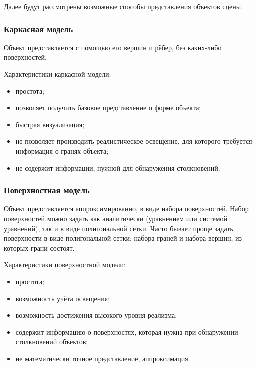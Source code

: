 Далее будут рассмотрены возможные способы представления объектов сцены.

\subsubsection{Каркасная модель}

Объект представляется с помощью его вершин и рёбер, без каких-либо поверхностей.

Характеристики каркасной модели:
\begin{itemize}
    \item простота;
    \item позволяет получить базовое представление о форме объекта;
    \item быстрая визуализация;
    \item не позволяет производить реалистическое освещение, для которого требуется информация о гранях объекта;
    \item не содержит информации, нужной для обнаружения столкновений.
\end{itemize}


\subsubsection{Поверхностная модель}

Объект представляется аппроксимированно, в виде набора поверхностей.
Набор поверхностей можно задать как аналитически (уравнением или системой уравнений), так и в виде полигональной сетки.
Часто бывает проще задать поверхности в виде полигональной сетки: набора граней и набора вершин, из которых грани состоят.

Характеристики поверхностной модели:
\begin{itemize}
    \item простота;
    \item возможность учёта освещения;
    \item возможность достижения высокого уровня реализма;
    \item содержит информацию о поверхностях, которая нужна при обнаружении столкновений объектов;
    \item не математически точное представление, аппроксимация.
\end{itemize}

